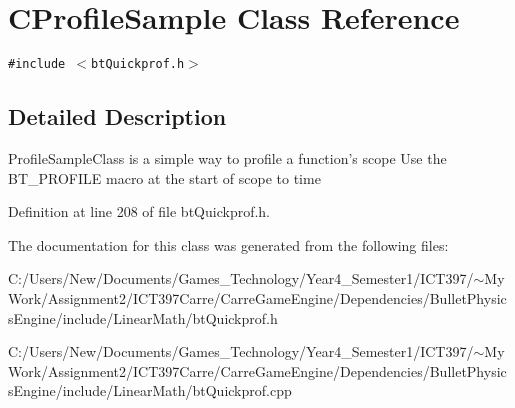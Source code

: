 \hypertarget{class_c_profile_sample}{
\section{CProfileSample Class Reference}
\label{class_c_profile_sample}
}
{\tt \#include $<$btQuickprof.h$>$}



\subsection{Detailed Description}
ProfileSampleClass is a simple way to profile a function's scope Use the BT\_\-PROFILE macro at the start of scope to time 

Definition at line 208 of file btQuickprof.h.

The documentation for this class was generated from the following files:\begin{CompactItemize}
\item 
C:/Users/New/Documents/Games\_\-Technology/Year4\_\-Semester1/ICT397/$\sim$My Work/Assignment2/ICT397Carre/CarreGameEngine/Dependencies/BulletPhysicsEngine/include/LinearMath/btQuickprof.h\item 
C:/Users/New/Documents/Games\_\-Technology/Year4\_\-Semester1/ICT397/$\sim$My Work/Assignment2/ICT397Carre/CarreGameEngine/Dependencies/BulletPhysicsEngine/include/LinearMath/btQuickprof.cpp\end{CompactItemize}

